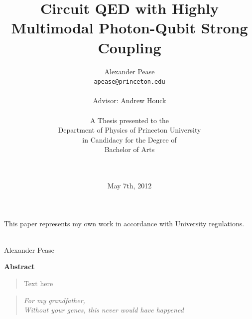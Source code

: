 \documentclass[11 pt, oneside]{book} %
\newenvironment{abstract}
{\thispagestyle{empty}
\begin{center}
\vspace*{1.5cm}
{\Large \bfseries Abstract}
\end{center}
\vspace{0.5cm}
\begin{quote}}
{\end{quote}}
\newenvironment{dedication}
{\thispagestyle{empty}
  \begin{center}
  \vspace*{1.5cm}
  {\LARGE }
  \end{center}
  \vspace{0.5cm}
  \begin{verse}\begin{center}}
{\end{center}\end{verse}}
\begin{document}
\title{Circuit QED with Highly Multimodal Photon-Qubit Strong Coupling}

\author{Alexander Pease \\
\texttt{apease@princeton.edu}\\
\\
Advisor: Andrew Houck\\
\\
A Thesis presented to the\\ 
Department of Physics of
Princeton University\\
in Candidacy for the Degree of \\
Bachelor of Arts\\
\\
\\}

\date{May 7th, 2012}
\maketitle

\begin{center}
This paper represents my own work in accordance with University regulations. \par
\vspace{1.5cm}
\hspace{0.5cm} \makebox[3.5in]{\hrulefill}\\
Alexander Pease
\end{center}

\newpage
\begin{abstract}
Text here
\end{abstract}



\setcounter{secnumdepth}{3} %
\setcounter{tocdepth}{3}    %
\tableofcontents            %



\listoffigures	%

\listoftables  %


\newpage
\begin{dedication}
\emph{For my grandfather,\\Without your genes, this never would have happened}
\end{dedication}
\end{document}

